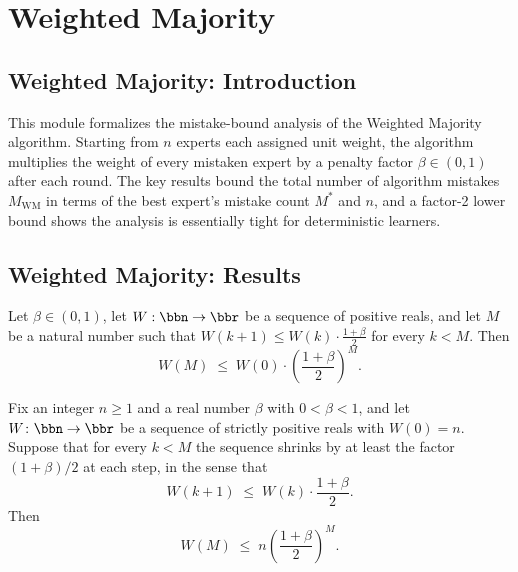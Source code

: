 \section{Weighted Majority}
\subsection*{Weighted Majority: Introduction}

This module formalizes the mistake-bound analysis of the Weighted Majority algorithm.
Starting from $n$ experts each assigned unit weight, the algorithm multiplies the weight
of every mistaken expert by a penalty factor $\beta \in (0,1)$ after each round.
The key results bound the total number of algorithm mistakes $M_{\mathrm{WM}}$ in terms
of the best expert's mistake count $M^*$ and $n$, and a factor-2 lower bound
shows the analysis is essentially tight for deterministic learners.

\subsection*{Weighted Majority: Results}

\begin{theorem}
\label{wm_weight_shrinkage}
\leanok
{}
Let $\beta \in (0,1)$, let $W : \bbn \to \bbr$ be a sequence of positive reals, and let
$M$ be a natural number such that $W(k+1) \le W(k) \cdot \tfrac{1+\beta}{2}$ for every
$k < M$. Then
\[
  W(M) \;\le\; W(0) \cdot \left(\frac{1+\beta}{2}\right)^{\!M}.
\]
\end{theorem}

\begin{theorem}
\label{wm_weight_upper_bound}
\leanok
{}
Fix an integer $n \ge 1$ and a real number $\beta$ with $0 < \beta < 1$, and let $W
\colon \bbn \to \bbr$ be a sequence of strictly positive reals with $W(0) = n$. Suppose
that for every $k < M$ the sequence shrinks by at least the factor $(1+\beta)/2$ at each
step, in the sense that
\[
  W(k+1) \;\le\; W(k)\cdot\frac{1+\beta}{2}.
\]
Then
\[
  W(M) \;\le\; n\left(\frac{1+\beta}{2}\right)^{\!M}.
\]
\end{theorem}

